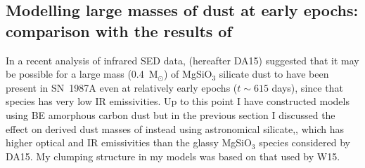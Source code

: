 \subsection{Modelling large masses of dust at early epochs: comparison 
with the results of \citet{Dwek2015}}
\label{dwek}

In a recent analysis of infrared SED data, \citet{Dwek2015} (hereafter 
DA15) suggested that it may be possible for a large mass (0.4~M$_\odot$) of 
MgSiO$_3$ silicate dust to have been present in SN~1987A even at 
relatively early epochs ($t\sim615$ days), since that species has very low 
IR emissivities.  Up to this point I have constructed models using 
\citet{Zubko1996} BE amorphous carbon dust but in the previous section I 
discussed the effect on derived dust masses of instead using 
\citet{Draine1984} astronomical silicate,, which has higher optical and IR 
emissivities than the glassy MgSiO$_3$ species considered by DA15. My 
clumping structure in my models was based on that used by W15.


